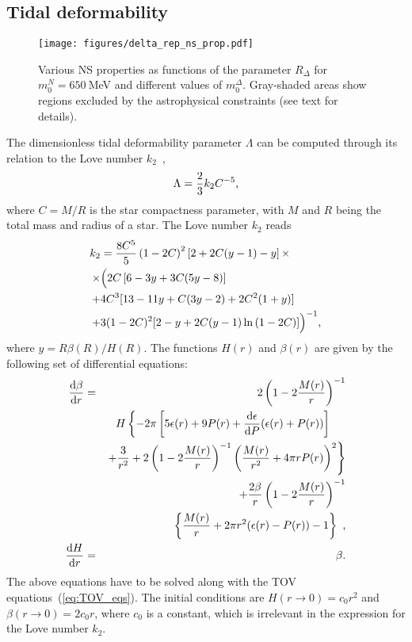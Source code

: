 \documentclass[preprint,showkeys,lengthcheck,nofootinbib,twocolumn,notitlepage,floatfix,superscriptaddress]{revtex4-1}
\newcommand{\dd}{\mathrm{d}}
\begin{document}
\subsection{Tidal deformability}
\label{sec:tidal}

\begin{figure*}[t!]\centering
  \texttt{[image: figures/delta\_rep\_ns\_prop.pdf]}
  \caption{Various NS properties as functions of the parameter $R_\Delta$ for $m_0^N=650~$MeV and different values of $m_0^\Delta$. Gray-shaded areas show regions excluded by the astrophysical constraints (see text for details).}
  \label{fig:R_delta_NS_params}
\end{figure*}

The dimensionless tidal deformability parameter $\Lambda$ can be computed through its relation to the Love number $k_2$~\cite{Hinderer:2007mb,Damour:2009vw,Binnington:2009bb,Yagi:2013awa,Hinderer:2009ca},
\begin{equation}
   \Lambda = \frac{2}{3} k_2 C^{-5} \textrm,
\end{equation}
where $C = M/R$ is the star compactness parameter, with $M$ and $R$ being the total mass and radius of a star. The Love number $k_2$ reads
\begin{equation}
\begin{split}
   k_2 &= \frac{8C^5}{5} \left(1-2C\right)^2 \left[ 2+2C(y-1)-y \right] \times \\
      \times & \Big(2C\left[6- 3y + 3C(5y-8) \right]\\
      +      & 4C^3[13-11y+C(3y-2)+2C^2(1+y)] \\
      +      & 3(1-2C)^2[2-y+2C(y-1)\ln{(1-2C)}]\Big)^{-1} \textrm,
\end{split}
\end{equation}
where $y = R\beta(R)/H(R)$. The functions $H(r)$ and $\beta(r)$ are given by the following set of differential equations:
\begin{eqnarray}
\frac{\dd \beta}{\dd r}&=&2 \left(1 - 2\frac{M(r)}{r}\right)^{-1} \nonumber\\
&& H\left\{-2\pi \left[5\epsilon(r)+9 P(r)+\frac{\dd \epsilon}{\dd P}(\epsilon(r)+P(r))\right]\phantom{\frac{3}{r^2}} \right. \nonumber\\
&& \left.+\frac{3}{r^2}+2\left(1 - 2\frac{M(r)}{r}\right)^{-1} \left(\frac{M(r)}{r^2}+4\pi r P(r)\right)^2\right\}\nonumber\\
&&+\frac{2\beta}{r}\left(1 - 2\frac{M(r)}{r}\right)^{-1}\nonumber\\
&&  \left\{\frac{M(r)}{r}+2\pi r^2 (\epsilon(r)-P(r)) - 1\right\}~\textrm,\\
\frac{\dd H}{\dd r}&=& \beta \textrm.
\end{eqnarray}
The above equations have to be solved along with the TOV equations~(\ref{eq:TOV_eqs}). The initial conditions are \mbox{$H(r\rightarrow 0) = c_0 r^2$} and \mbox{$\beta(r\rightarrow 0) =2c_0 r$}, where $c_0$ is a constant, which is irrelevant in the expression for the Love number $k_2$.
\end{document}
